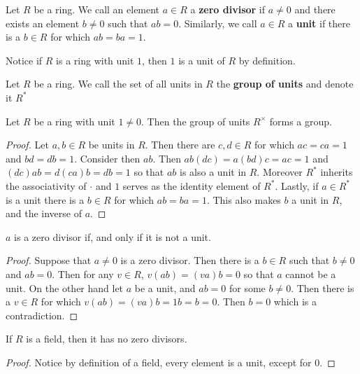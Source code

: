 \begin{definition}
    Let $R$ be a ring. We call an element  $a \in R$ a  \textbf{zero divisor} if
    $a \neq 0$ and there exists an element  $b \neq 0$ such that  $ab=0$.
    Similarly, we call $a \in R$ a \textbf{unit} if there is a $b \in R$ for
    which  $ab=ba=1$.
\end{definition}

\begin{example}\label{1.2}
    Notice if $R$ is a ring with unit $1$, then $1$ is a unit of $R$ by
    definition.
\end{example}

\begin{definition}
    Let $R$ be a ring. We call the set of all units in  $R$ the  \textbf{group
    of units} and denote it $R^\ast$
\end{definition}

\begin{lemma}\label{1.1.3}
    Let $R$ be a ring with unit  $1 \neq 0$. Then the group of units $R^\times$
    forms a group.
\end{lemma}
\begin{proof}
    Let $a,b \in R$ be units in $R$. Then there are $c,d \in R$ for which
    $ac=ca=1$ and  $bd=db=1$. Consider then $ab$. Then  $ab(dc)=a(bd)c=ac=1$ and
    $(dc)ab=d(ca)b=db=1$ so that $ab$ is also a unit in $R$. Moreover $R^\ast$
    inherits the associativity of  $\cdot$ and $1$ serves as the identity
    element of $R^\ast$. Lastly, if $a \in R^\ast$ is a unit there is a $b
    \in R$ for which $ab=ba=1$. This also makes $b$ a unit in $R$, and the
    inverse of $a$.
\end{proof}
\begin{corollary}
    $a$ is a zero divisor if, and only if it is not a unit.
\end{corollary}
\begin{proof}
    Suppose that $a \neq 0$ is a zero divisor. Then there is a  $b \in R$ such
    that $b \neq 0$ and $ab=0$. Then for any $v \in R$,  $v(ab)=(va)b=0$ so that
    $a$ cannot be a unit. On the other hand let  $a$ be a unit, and  $ab=0$ for
    some  $b \neq 0$. Then there is a  $v \in R$ for which
    $v(ab)=(va)b=1b=b=0$. Then $b=0$ which is a contradiction.
\end{proof}
\begin{corollary}
    If $R$ is a field, then it has no zero divisors.
\end{corollary}
\begin{proof}
    Notice by definition of a field, every element is a unit, except for $0$.
\end{proof}

